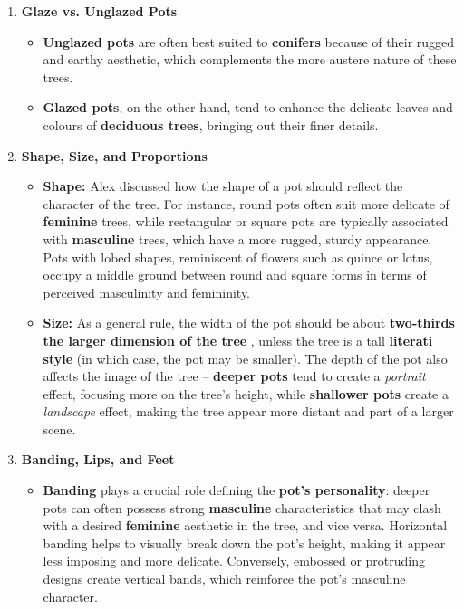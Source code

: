 \begin{enumerate}
    \item \textbf{Glaze vs. Unglazed Pots}
    \begin{itemize}
        \item \textbf{Unglazed pots} are often best suited to \textbf{conifers} because of their rugged and earthy aesthetic, which complements the more austere nature of these trees.
        \item \textbf{Glazed pots}, on the other hand, tend to enhance the delicate leaves and colours of \textbf{deciduous trees}, bringing out their finer details.
    \end{itemize}

    \item \textbf{Shape, Size, and Proportions}
    \begin{itemize}
        \item \textbf{Shape:} Alex discussed how the shape of a pot should reflect the character of the tree. For instance, round pots often suit more delicate of \textbf{feminine} trees, while rectangular or square pots are typically associated with \textbf{masculine} trees, which have a more rugged, sturdy appearance. Pots with lobed shapes, reminiscent of flowers such as quince or lotus, occupy a middle ground between round and square forms in terms of perceived masculinity and femininity.

        \item \textbf{Size:} As a general rule, the width of the pot should be about \textbf{two-thirds the larger dimension of the tree} , unless the tree is a tall \textbf{literati style} (in which case, the pot may be smaller). The depth of the pot also affects the image of the tree – \textbf{deeper pots} tend to create a \emph{portrait} effect, focusing more on the tree's height, while \textbf{shallower pots} create a \emph{landscape} effect, making the tree appear more distant and part of a larger scene.
    \end{itemize}

    \item \textbf{Banding, Lips, and Feet}
    \begin{itemize}
        \item \textbf{Banding} plays a crucial role defining the \textbf{pot's personality}: deeper pots can often possess strong \textbf{masculine} characteristics that may clash with a desired \textbf{feminine} aesthetic in the tree, and vice versa. Horizontal banding helps to visually break down the pot's height, making it appear less imposing and more delicate. Conversely, embossed or protruding designs create vertical bands, which reinforce the pot's masculine character.


\end{itemize}
\end{enumerate}
